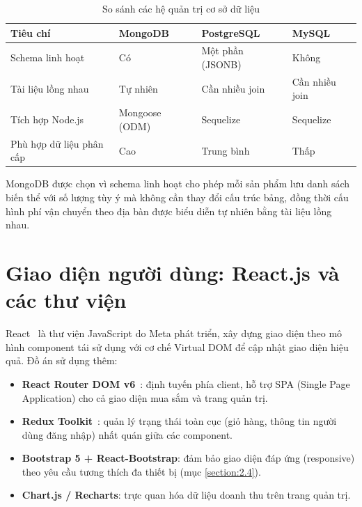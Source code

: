 \documentclass[../DoAn.tex]{subfiles}
\begin{document}
\begin{table}[H]
\centering
\caption{So sánh các hệ quản trị cơ sở dữ liệu}
\label{tab:db}
\begin{tabular}{|p{3.5cm}|p{3cm}|p{3cm}|p{3cm}|}
\hline
\textbf{Tiêu chí} & \textbf{MongoDB} & \textbf{PostgreSQL} & \textbf{MySQL} \\
\hline
Schema linh hoạt & Có & Một phần (JSONB) & Không \\
\hline
Tài liệu lồng nhau & Tự nhiên & Cần nhiều join & Cần nhiều join \\
\hline
Tích hợp Node.js & Mongoose (ODM) & Sequelize & Sequelize \\
\hline
Phù hợp dữ liệu phân cấp & Cao & Trung bình & Thấp \\
\hline
\end{tabular}
\end{table}

MongoDB được chọn vì schema linh hoạt cho phép mỗi sản phẩm lưu danh sách biến
thể với số lượng tùy ý mà không cần thay đổi cấu trúc bảng, đồng thời cấu hình
phí vận chuyển theo địa bàn được biểu diễn tự nhiên bằng tài liệu lồng nhau.

\section{Giao diện người dùng: React.js và các thư viện}
\label{section:3.4}

React~\cite{react} là thư viện JavaScript do Meta phát triển, xây dựng giao diện
theo mô hình component tái sử dụng với cơ chế Virtual DOM để cập nhật giao diện
hiệu quả. Đồ án sử dụng thêm:

\begin{itemize}
  \item \textbf{React Router DOM v6}~\cite{reactrouter}: định tuyến phía client,
        hỗ trợ SPA \break (Single Page Application) cho cả giao diện mua sắm và trang
        quản trị.
  \item \textbf{Redux Toolkit}~\cite{redux}: quản lý trạng thái toàn cục (giỏ
        hàng, thông tin người dùng đăng nhập) nhất quán giữa các component.
  \item \textbf{Bootstrap 5 + React-Bootstrap}: đảm bảo giao diện đáp ứng
        (responsive) theo yêu cầu tương thích đa thiết bị (mục \ref{section:2.4}).
  \item \textbf{Chart.js / Recharts}: trực quan hóa dữ liệu doanh thu trên trang
        quản trị.
\end{itemize}
\end{document}
